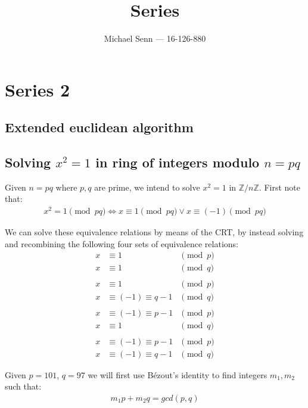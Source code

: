 \documentclass[a4paper]{scrreprt}
\title{Series \series}
\author{Michael Senn \maillink{michael.senn@students.unibe.ch} --- 16-126-880}
\date{\printdate}
\newcommand{\series}{2}
\begin{document}
\maketitle


\setcounter{chapter}{\numexpr \series - 1 \relax}

\chapter{Series \series}

\section{Extended euclidean algorithm}

\section{Solving $x^2 = 1$ in ring of integers modulo $n = pq$}

Given $n = pq$ where $p, q$ are prime, we intend to solve $x^2 = 1$ in
$\mathbb{Z} / n\mathbb{Z}$. First note that:
\begin{align*}
		x^2 = 1 \pmod{pq} \Leftrightarrow x \equiv 1 \pmod{pq} \lor x \equiv (-1) \pmod {pq}
\end{align*}

We can solve these equivalence relations by means of the CRT, by instead
solving and recombining the following four sets of equivalence relations:
\begin{align*}
		x & \equiv 1 & \pmod{p} \\
		x & \equiv 1 & \pmod{q} \\
		\\
		x & \equiv 1 & \pmod{p} \\
		x & \equiv (-1) \equiv q-1 & \pmod{q} \\
		\\
		x & \equiv (-1) \equiv p-1 & \pmod{p} \\
		x & \equiv 1 & \pmod{q} \\
		\\
		x & \equiv (-1) \equiv p-1 & \pmod{p} \\
		x & \equiv (-1) \equiv q-1 & \pmod{q}
\end{align*}

Given $p = 101$, $q = 97$ we will first use Bézout's identity to find integers
$m_1, m_2$ such that:
\begin{align*}
		m_1 p + m_2 q = gcd(p, q)
\end{align*}
\end{document}
